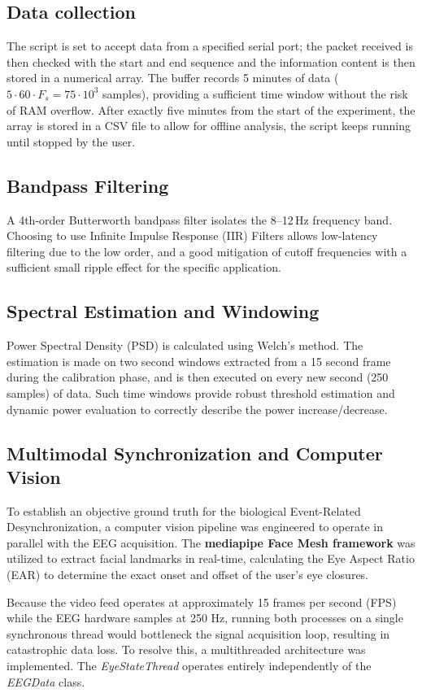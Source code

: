 \documentclass[journal, a4paper]{IEEEtran}
\begin{document}
\subsection{Data collection}
The script is set to accept data from a specified serial port; the packet received is then checked with the start and end sequence and the information content is then stored in a numerical array. The buffer records 5 minutes of data ($5\cdot60\cdot F_s = 75\cdot 10^{3}$ samples), providing a sufficient time window without the risk of RAM overflow. After exactly five minutes from the start of the experiment, the array is stored in a CSV file to allow for offline analysis, the script keeps running until stopped by the user.

\subsection{Bandpass Filtering}
A 4th-order Butterworth bandpass filter isolates the 8--12\,Hz frequency band. Choosing to use Infinite Impulse Response (IIR) Filters allows low-latency filtering due to the low order, and a good mitigation of cutoff frequencies with a sufficient small ripple effect for the specific application.

\subsection{Spectral Estimation and Windowing}
Power Spectral Density (PSD) is calculated using Welch's method. The estimation is made on two second windows extracted from a 15 second frame during the calibration phase, and is then executed on every new second (250 samples) of data. Such time windows provide robust threshold estimation and dynamic power evaluation to correctly describe the power increase/decrease.

\subsection{Multimodal Synchronization and Computer Vision}
To establish an objective ground truth for the biological Event-Related Desynchronization, a computer vision pipeline was engineered to operate in parallel with the EEG acquisition. The \textbf{mediapipe Face Mesh framework} was utilized to extract facial landmarks in real-time, calculating the Eye Aspect Ratio (EAR) to determine the exact onset and offset of the user's eye closures. 

Because the video feed operates at approximately 15 frames per second (FPS) while the EEG hardware samples at 250 Hz, running both processes on a single synchronous thread would bottleneck the signal acquisition loop, resulting in catastrophic data loss. To resolve this, a multithreaded architecture was implemented. The \textit{EyeStateThread} operates entirely independently of the \textit{EEGData} class. 
\end{document}
